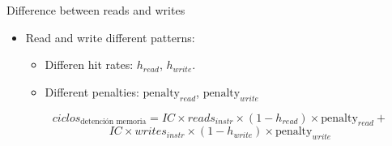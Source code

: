 \begin{frame}[t]{Difference between reads and writes}
\begin{itemize}
  \item Read and write different patterns:
    \begin{itemize}
      \item Differen hit rates: $h_{read}$, $h_{write}$.
      \item Different penalties: $\text{penalty}_{read}$, $\text{penalty}_{write}$
    \end{itemize}

\[
ciclos_{\text{detención memoria}} =
IC \times reads_{instr} \times (1 - h_{read}) \times \text{penalty}_{read} +
\]
\[
IC \times writes_{instr} \times (1 - h_{write}) \times \text{penalty}_{write}
\]
\end{itemize}
\end{frame}

